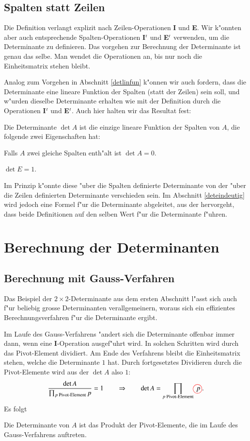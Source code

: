 \subsection{Spalten statt Zeilen}
Die Definition verlangt explizit nach Zeilen-Operationen {\bf I}
und {\bf E}.
Wir k"onnten aber auch entsprechende Spalten-Operationen
{\bf I$\mathstrut^t$}
und
{\bf E$\mathstrut^t$}
verwenden, um die Determinante zu definieren.
Das vorgehen zur Berechnung der Determinante ist genau das selbe.
Man wendet die Operationen an, bis nur noch die Einheitsmatrix stehen bleibt.

Analog zum Vorgehen in Abschnitt \ref{detlinfun} k"onnen wir auch
fordern, dass die Determinante eine lineare Funktion der Spalten
(statt der Zeilen) sein soll, und w"urden dieselbe Determinante
erhalten wie mit der Definition durch die Operationen 
{\bf I$\mathstrut^t$}
und
{\bf E$\mathstrut^t$}.
Auch hier halten wir das Resultat fest:
\begin{satz}
Die Determinante
$\det A$ ist die einzige lineare Funktion der Spalten von $A$, die folgende
zwei Eigenschaften hat:
\begin{compactenum}
\item Falls $A$ zwei gleiche Spalten enth"alt ist $\det A=0$.
\item $\det E = 1$.
\end{compactenum}
\end{satz}
Im Prinzip k"onnte diese "uber die Spalten definierte Determinante
von der "uber die Zeilen definierten Determinante verschieden sein.
Im Abschnitt \ref{deteindeutig} wird jedoch eine Formel f"ur die
Determinante abgeleitet, aus der hervorgeht, dass beide Definitionen
auf den selben Wert f"ur die Determinante f"uhren.

\section{Berechnung der Determinanten}
\subsection{Berechnung mit Gauss-Verfahren}
Das Beispiel der $2\times 2$-Determinante aus dem ersten Abschnitt
l"asst sich auch f"ur beliebig grosse Determinanten verallgemeinern,
woraus sich ein effizientes Berechnungsverfahren f"ur die Determinante
ergibt.

Im Laufe des Gauss-Verfahrens "andert sich die Determinante offenbar
immer dann, wenn eine {\bf I}-Operation ausgef"uhrt wird.
In solchen Schritten wird durch das Pivot-Element dividiert.
Am Ende des 
Verfahrens bleibt die Einheitsmatrix stehen, welche die Determinante
$1$ hat.
Durch fortgesetztes Dividieren durch die Pivot-Elemente wird
aus der $\det A$ also $1$:
\[
\frac{\det A}{\prod_{\text{$p$ Pivot-Element} }p}=1\qquad\Rightarrow
\qquad
\det A=\prod_{\text{$p$ Pivot-Element}} p%
\begin{picture}(0,0)
\color{red}\put(-4,2){\circle{13}}
\end{picture}%
\;.
\]
Es folgt
\begin{satz}
\label{detprodpivot}
Die Determinante von $A$ ist das Produkt der Pivot-Elemente,
die im Laufe des Gauss-Verfahrens auftreten.
\end{satz}

